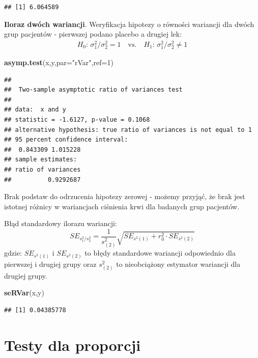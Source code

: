 \documentclass[polish,]{book}
\newenvironment{Shaded}{\begin{snugshade}}{\end{snugshade}}
\newcommand{\DataTypeTok}[1]{\textcolor[rgb]{0.13,0.29,0.53}{#1}}
\newcommand{\DecValTok}[1]{\textcolor[rgb]{0.00,0.00,0.81}{#1}}
\newcommand{\KeywordTok}[1]{\textcolor[rgb]{0.13,0.29,0.53}{\textbf{#1}}}
\newcommand{\NormalTok}[1]{#1}
\newcommand{\StringTok}[1]{\textcolor[rgb]{0.31,0.60,0.02}{#1}}
\begin{document}
\begin{verbatim}
## [1] 6.064589
\end{verbatim}

\textbf{Iloraz dwóch wariancji}. Weryfikacja hipotezy o równości wariancji dla dwóch grup pacjentów - pierwszej podano placebo a drugiej lek:
\[
\begin{array}{ll}
H_0:\,\sigma^2_1/\sigma^2_2 = 1\quad\mbox{vs.}\quad H_1:\,\sigma^2_1/\sigma^2_2 \neq 1
\end{array}
\]

\begin{Shaded}
\begin{Highlighting}[]
\KeywordTok{asymp.test}\NormalTok{(x,y,}\DataTypeTok{par=}\StringTok{"rVar"}\NormalTok{,}\DataTypeTok{ref=}\DecValTok{1}\NormalTok{)}
\end{Highlighting}
\end{Shaded}

\begin{verbatim}
## 
##  Two-sample asymptotic ratio of variances test
## 
## data:  x and y
## statistic = -1.6127, p-value = 0.1068
## alternative hypothesis: true ratio of variances is not equal to 1
## 95 percent confidence interval:
##  0.843309 1.015228
## sample estimates:
## ratio of variances 
##          0.9292687
\end{verbatim}

Brak podstaw do odrzucenia hipotezy zerowej - możemy przyjąć, że brak jest istotnej różnicy w wariancjach ciśnienia krwi dla badanych grup pacjentów.

Błąd standardowy ilorazu wariancji:
\begin{equation}
SE_{s_1^2/s_2^2}=\frac{1}{s^{2}_{(2)}}\sqrt{
SE_{s^2(1)} +r_0^2\cdot
SE_{s^2(2)}}
\label{eq:wz1150}
\end{equation}
gdzie: \(SE_{s^2(1)}\) i \(SE_{s^2(2)}\) to błędy standardowe wariancji odpowiednio dla pierwszej i drugiej grupy oraz \(s^2_{(2)}\) to nieobciążony estymator wariancji dla drugiej grupy.

\begin{Shaded}
\begin{Highlighting}[]
\KeywordTok{seRVar}\NormalTok{(x,y)}
\end{Highlighting}
\end{Shaded}

\begin{verbatim}
## [1] 0.04385778
\end{verbatim}

\hypertarget{part_11.3}{%
\section{Testy dla proporcji}\label{part_11.3}}
\end{document}
